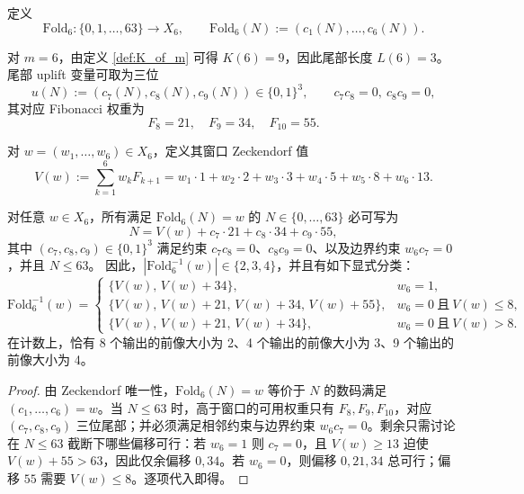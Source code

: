 \begin{definition}\label{def:fold6}
定义
$$
\mathrm{Fold}_6:\{0,1,\dots,63\}\to X_6,\qquad \mathrm{Fold}_6(N):=(c_1(N),\dots,c_6(N)).
$$
\end{definition}

\begin{definition}\label{def:m6_tail_uplift}
对 \(m=6\)，由定义 \ref{def:K_of_m} 可得 \(K(6)=9\)，因此尾部长度 \(L(6)=3\)。尾部 uplift 变量可取为三位
$$
u(N):=(c_7(N),c_8(N),c_9(N))\in\{0,1\}^3,\qquad c_7c_8=0,\ c_8c_9=0,
$$
其对应 Fibonacci 权重为
$$
F_8=21,\quad F_9=34,\quad F_{10}=55.
$$
\end{definition}

\begin{definition}[Zeckendorf 值]\label{def:Vw_m6}
对 \(w=(w_1,\dots,w_6)\in X_6\)，定义其窗口 Zeckendorf 值
$$
V(w):=\sum_{k=1}^{6} w_k F_{k+1}
= w_1\cdot 1+w_2\cdot 2+w_3\cdot 3+w_4\cdot 5+w_5\cdot 8+w_6\cdot 13.
$$
\end{definition}

\begin{theorem}\label{thm:fold6_preimage_structure_here}
对任意 \(w\in X_6\)，所有满足 \(\mathrm{Fold}_6(N)=w\) 的 \(N\in\{0,\dots,63\}\) 必可写为
$$
N=V(w)+c_7\cdot 21+c_8\cdot 34+c_9\cdot 55,
$$
其中 \((c_7,c_8,c_9)\in\{0,1\}^3\) 满足约束 \(c_7c_8=0\)、\(c_8c_9=0\)、以及边界约束 \(w_6c_7=0\)，并且 \(N\le 63\)。
因此，\(|\mathrm{Fold}_6^{-1}(w)|\in\{2,3,4\}\)，并且有如下显式分类：
\[
\mathrm{Fold}_6^{-1}(w)=
\begin{cases}
\{V(w),\,V(w)+34\}, & w_6=1,\\[4pt]
\{V(w),\,V(w)+21,\,V(w)+34,\,V(w)+55\}, & w_6=0\ \text{且}\ V(w)\le 8,\\[4pt]
\{V(w),\,V(w)+21,\,V(w)+34\}, & w_6=0\ \text{且}\ V(w)> 8.
\end{cases}
\]
在计数上，恰有 8 个输出的前像大小为 2、4 个输出的前像大小为 3、9 个输出的前像大小为 4。
\end{theorem}

\begin{proof}
由 Zeckendorf 唯一性，\(\mathrm{Fold}_6(N)=w\) 等价于 \(N\) 的数码满足 \((c_1,\dots,c_6)=w\)。当 \(N\le 63\) 时，高于窗口的可用权重只有 \(F_8,F_9,F_{10}\)，对应 \((c_7,c_8,c_9)\) 三位尾部；并必须满足相邻约束与边界约束 \(w_6c_7=0\)。剩余只需讨论在 \(N\le 63\) 截断下哪些偏移可行：若 \(w_6=1\) 则 \(c_7=0\)，且 \(V(w)\ge 13\) 迫使 \(V(w)+55>63\)，因此仅余偏移 \(0,34\)。若 \(w_6=0\)，则偏移 \(0,21,34\) 总可行；偏移 \(55\) 需要 \(V(w)\le 8\)。逐项代入即得。
\end{proof}

